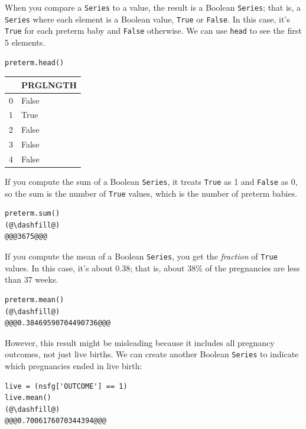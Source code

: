 When you compare a \passthrough{\lstinline!Series!} to a value, the
result is a Boolean \passthrough{\lstinline!Series!}; that is, a
\passthrough{\lstinline!Series!} where each element is a Boolean value,
\passthrough{\lstinline!True!} or \passthrough{\lstinline!False!}. In
this case, it's \passthrough{\lstinline!True!} for each preterm baby and
\passthrough{\lstinline!False!} otherwise. We can use
\passthrough{\lstinline!head!} to see the first 5 elements.

\begin{lstlisting}[]
preterm.head()
\end{lstlisting}

\begin{tabular}{ll}
\midrule
{} &  PRGLNGTH \\
\midrule
0 &     False \\
1 &      True \\
2 &     False \\
3 &     False \\
4 &     False \\
\midrule
\end{tabular}

If you compute the sum of a Boolean \passthrough{\lstinline!Series!}, it
treats \passthrough{\lstinline!True!} as 1 and
\passthrough{\lstinline!False!} as 0, so the sum is the number of
\passthrough{\lstinline!True!} values, which is the number of preterm
babies.

\begin{lstlisting}[]
preterm.sum()
(@\dashfill@)
@@@3675@@@
\end{lstlisting}

If you compute the mean of a Boolean \passthrough{\lstinline!Series!},
you get the \emph{fraction} of \passthrough{\lstinline!True!} values. In
this case, it's about 0.38; that is, about 38\% of the pregnancies are
less than 37 weeks.

\begin{lstlisting}[]
preterm.mean()
(@\dashfill@)
@@@0.38469590704490736@@@
\end{lstlisting}

However, this result might be misleading because it includes all
pregnancy outcomes, not just live births. We can create another Boolean
\passthrough{\lstinline!Series!} to indicate which pregnancies ended in
live birth:

\begin{lstlisting}[]
live = (nsfg['OUTCOME'] == 1)
live.mean()
(@\dashfill@)
@@@0.7006176070344394@@@
\end{lstlisting}

